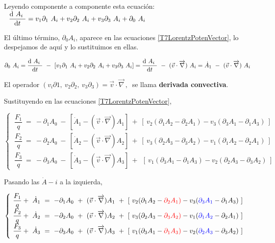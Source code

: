 Leyendo componente a componente esta ecuación: $\ \  \displaystyle \dv{\ A_i \ }{t}=v_1\partial_1 \ A_i + v_2\partial_2 \ A_i + v_3\partial_3 \ A_i+\partial_0 \ A_i$

El último término, $\partial_0 A_i$, aparece en las ecuaciones \ref{T7LorentzPotenVector}, lo despejamos de aquí y lo sustituimos en ellas.

$\displaystyle \partial_0 \ A_i =
 \dv{\ A_i \ }{t} \ - \ \left[v_1\partial_1 \ A_i + v_2\partial_2 \ A_i + v_3\partial_3 \ A_i \right] =  \dv{\ A_i \ }{t} \ - \ (\vec v \cdot \overrightarrow \nabla) \ A_i= \dot A_1  \ - \ (\vec v \cdot \overrightarrow \nabla) \ A_i$
 
 El operador $(v_i\partial 1, \ v_2 \partial_2,\ v_3\partial_3 )=\vec v \cdot \overrightarrow \nabla \, , \ $  se llama \textbf{derivada convectiva}.

Sustituyendo en las ecuaciones \ref{T7LorentzPotenVector},

$\begin{cases}
\ \dfrac{F_1}{q} \ =\ -\partial_1A_0\ - \ [\dot A_1 - (\vec v \cdot \overrightarrow \nabla ) A_1 ] \ + \ [\ v_2(\partial_1 A_2 - \partial_2 A_1) - v_3(\partial_3 A_1 - \partial_1 A_3) \ ]	\\
\ \dfrac{F_2}{q} \ = \ -\partial_2A_0\ - \ [\dot A_2 - (\vec v \cdot \overrightarrow \nabla ) A_2 ] \ + \ [\ v_3(\partial_2 A_3 - \partial_3 A_2) - v_1(\partial_1 A_2 - \partial_2 A_1) \ ]	\\
\ \dfrac{F_3}{q} \ = \ -\partial_3A_0\ - \ [\dot A_3 - (\vec v \cdot \overrightarrow \nabla ) A_3 ] \ + \ 
\ [\  v_1(\partial_3 A_1 - \partial_1 A_3) - v_2(\partial_2 A_3 - \partial_3 A_2) \ ]	
\end{cases}$

Pasando las $\dot A-i$ a la izquierda,

$\begin{cases}
\ \dfrac{F_1}{q} + \ \dot A_1 \ =\ -\partial_1A_0\ + \  (\vec v \cdot \overrightarrow \nabla ) A_1  \ + \ [\ v_2(\partial_1 A_2 - \textcolor{red}{\partial_2 A_1)} - v_3(\textcolor{blue}{\partial_3 A_1} - \partial_1 A_3) \ ]	\\
\ \dfrac{F_2}{q}+ \ \dot A_2 \ = \ -\partial_2A_0\ +\  (\vec v \cdot \overrightarrow \nabla ) A_2  \ + \ [\ v_3(\partial_2 A_3 - \textcolor{red}{\partial_3 A_2)} - v_1(\textcolor{blue}{\partial_1 A_2} - \partial_2 A_1) \ ]	\\
\ \dfrac{F_3}{q}+ \ \dot A_3 \ = \ -\partial_3A_0\ +\  (\vec v \cdot \overrightarrow \nabla ) A_3  \ +  \ [\  v_1(\partial_3 A_1 - \textcolor{red}{\partial_1 A_3)} - v_2(\textcolor{blue}{\partial_2 A_3} - \partial_3 A_2) \ ]	
\end{cases}$


